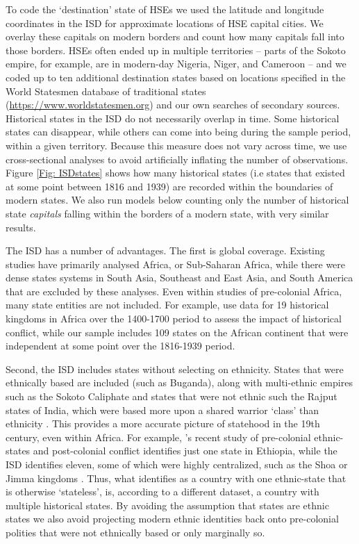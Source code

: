 To code the `destination' state of HSEs we used the latitude and longitude
coordinates in the ISD for approximate locations of HSE capital cities. We
overlay these capitals on modern borders and count how many capitals fall into
those borders. HSEs often ended up in multiple territories -- parts of the
Sokoto empire, for example, are in modern-day Nigeria, Niger, and Cameroon --
and we coded up to ten additional destination states based on locations
specified in the World Statesmen database of traditional states
(\url{https://www.worldstatesmen.org}) and our own searches of secondary
sources. Historical states in the ISD do not necessarily overlap in time. Some
historical states can disappear, while others can come into being during the
sample period, within a given territory. Because this measure does not vary
across time, we use cross-sectional analyses to avoid artificially inflating the
number of observations.  Figure \ref{Fig: ISDstates} shows how many historical
states (i.e states that existed at some point between 1816 and 1939) are
recorded within the boundaries of modern states. We also run models below
counting only the number of historical state \textit{capitals} falling within
the borders of a modern state, with very similar results. 
    
The ISD has a number of advantages. The first is global coverage. Existing
studies have primarily analysed Africa, or Sub-Saharan Africa, while there were
dense states systems in South Asia, Southeast and East Asia, and South America
that are excluded by these analyses. Even within studies of pre-colonial Africa,
many state entities are not included. For example, \citet{Besley2014} use data
for 19 historical kingdoms in Africa over the 1400-1700 period to assess the
impact of historical conflict, while our sample includes 109 states on the
African continent that were independent at some point over the 1816-1939 period.

    
Second, the ISD includes states without selecting on ethnicity.
States that were ethnically based are included (such as Buganda), along with
multi-ethnic empires such as the Sokoto Caliphate and states that were not
ethnic such the Rajput states of India, which were based
more upon a shared warrior `class' than ethnicity \citep[12]{Ramusack2004}. This
provides a more accurate picture of statehood in the 19th century, even within
Africa. For example, \citet{Paine2019}'s recent study of pre-colonial
ethnic-states and post-colonial conflict identifies just one state in Ethiopia,
while the ISD identifies eleven, some of which were highly centralized, such as
the Shoa or Jimma kingdoms \citep{Lewis2001}. Thus, what \citet{Paine2019}
identifies as a country with one ethnic-state that is otherwise `stateless', is,
according to a different dataset, a country with multiple historical states. By
avoiding the assumption that states are ethnic states we also avoid projecting
modern ethnic identities back onto pre-colonial polities that were not
ethnically based or only marginally so.

